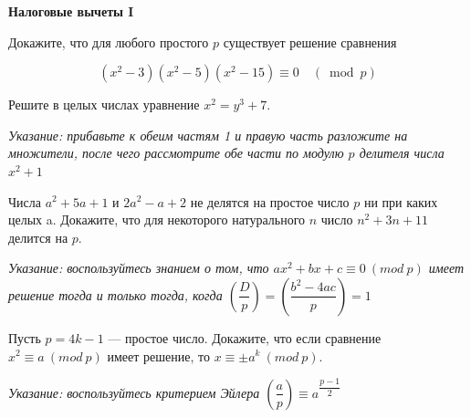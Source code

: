 \centerline{\bf \Huge Налоговые вычеты I}

\begin{flushright}
        \scriptsize{}
\end{flushright}

Докажите, что для любого простого $p$ существует решение сравнения

$$
\left(x^2-3\right)\left(x^2-5\right)\left(x^2-15\right) \equiv 0 \quad(\bmod p) 
$$

Решите в целых числах уравнение $x^2=y^3+7$.

\textit{Указание: прибавьте к обеим частям 1 и правую часть разложите на множители, после чего рассмотрите обе части по модулю $p$ делителя числа $x^2+1$}

Числа $a^2+5 a+1$ и $2 a^2-a+2$ не делятся на простое число $p$ ни при каких целых a. Докажите, что для некоторого натурального $n$ число $n^2+3 n+11$ делится на $p$.

\textit{Указание: воспользуйтесь знанием о том, что $ax^2 + bx + c \equiv 0 \ (mod \ p)$ имеет решение тогда и только тогда, когда $\left(\dfrac{D}{p}\right) = \left(\dfrac{b^2-4ac}{p}\right) = 1$}

Пусть $p=4 k-1$ --- простое число. Докажите, что если сравнение $x^2 \equiv a \ (mod \ p)$ имеет решение, то $x \equiv \pm a^k \ (mod \ p)$.

\textit{Указание: воспользуйтесь критерием Эйлера $\left(\dfrac{a}{p}\right) \equiv a^{\dfrac{p-1}{2}}$}